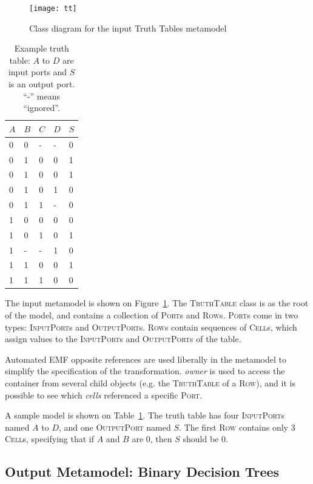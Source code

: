 \documentclass[a4paper]{scrartcl}
\newcommand*{\class}[1]{\textsc{#1}}
\newcommand*{\feature}[1]{\emph{#1}}
\begin{document}
\begin{figure}
  \centering
  \texttt{[image: tt]}
  \caption{Class diagram for the input Truth Tables metamodel}
  \label{fig:tt-metamodel}
\end{figure}

\begin{table}
  \centering
  \begin{tabular}{llll|l}
    $A$ & $B$ & $C$ & $D$ & $S$ \\
    \hline
    0 & 0 & - & - & 0 \\
    0 & 1 & 0 & 0 & 1 \\
    0 & 1 & 0 & 0 & 1 \\
    0 & 1 & 0 & 1 & 0 \\
    0 & 1 & 1 & - & 0 \\
    1 & 0 & 0 & 0 & 0 \\
    1 & 0 & 1 & 0 & 1 \\
    1 & - & - & 1 & 0 \\
    1 & 1 & 0 & 0 & 1 \\
    1 & 1 & 1 & 0 & 0 \\
  \end{tabular}
  \caption{Example truth table: $A$ to $D$ are input ports and $S$ is an output port. ``-'' means ``ignored''.}
  \label{tab:tt-example}
\end{table}

The input metamodel is shown on Figure~\ref{fig:tt-metamodel}. The
\class{Truth\-Table} class is as the root of the model, and contains a
collection of \class{Port}s and \class{Row}s. \class{Port}s come in two types:
\class{Input\-Port}s and \class{Output\-Port}s. \class{Row}s contain sequences
of \class{Cell}s, which assign values to the \class{Input\-Port}s and
\class{Output\-Port}s of the table.

Automated EMF opposite references are used liberally in the metamodel to
simplify the specification of the transformation. \feature{owner} is used to
access the container from several child objects (e.g. the \class{Truth\-Table}
of a \class{Row}), and it is possible to see which \feature{cells} referenced a
specific \class{Port}.

A sample model is shown on Table~\ref{tab:tt-example}. The truth table has four
\class{Input\-Port}s named $A$ to $D$, and one \class{Output\-Port} named $S$.
The first \class{Row} contains only 3 \class{Cell}s, specifying that if $A$ and
$B$ are 0, then $S$ should be 0.

\subsection{Output Metamodel: Binary Decision Trees}
\label{sec:outp-metam-binary}
\end{document}
